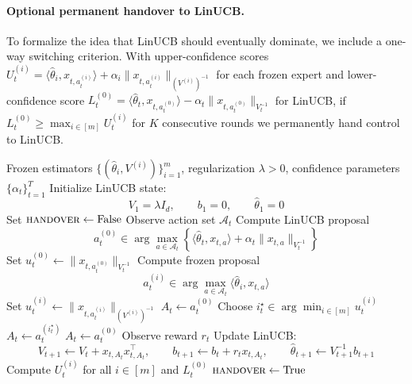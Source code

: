 \documentclass{article}
\theoremstyle{definition}
\theoremstyle{remark}
\theoremstyle{remark}
\begin{document}
\paragraph{Optional permanent handover to LinUCB.}
To formalize the idea that LinUCB should eventually dominate, we include
a one-way switching criterion. With upper-confidence scores
$U_t^{(i)} = \langle\widehat\theta_i,x_{t,a_t^{(i)}}\rangle + \alpha_i\|x_{t,a_t^{(i)}}\|_{(V^{(i)})^{-1}}$
for each frozen expert and lower-confidence score
$L_t^{(0)} = \langle\widehat\theta_t,x_{t,a_t^{(0)}}\rangle - \alpha_t\|x_{t,a_t^{(0)}}\|_{V_t^{-1}}$
for LinUCB, if $L_t^{(0)} \ge \max_{i\in[m]} U_t^{(i)}$ for $K$
consecutive rounds we permanently hand control to LinUCB.

\begin{algorithm}[t]
\caption{Confidence-Gated Master over Frozen Policies and LinUCB}
\label{alg:confidence-gated}
\begin{algorithmic}[1]
\Require Frozen estimators $\{(\widehat{\theta}_i,V^{(i)})\}_{i=1}^m$, regularization $\lambda>0$, confidence parameters $\{\alpha_t\}_{t=1}^T$
\State Initialize LinUCB state:
\[
V_1=\lambda I_d,\qquad b_1=0,\qquad \widehat{\theta}_1=0
\]
\State Set $\textsc{handover}\gets \mathrm{False}$
    \State Observe action set $\mathcal{A}_t$
    \State Compute LinUCB proposal
    \[
    a_t^{(0)} \in \arg\max_{a\in\mathcal{A}_t}
    \left\{
    \langle \widehat{\theta}_t,x_{t,a}\rangle
    + \alpha_t \|x_{t,a}\|_{V_t^{-1}}
    \right\}
    \]
    \State Set $u_t^{(0)} \gets \|x_{t,a_t^{(0)}}\|_{V_t^{-1}}$
        \State Compute frozen proposal
        \[
        a_t^{(i)} \in \arg\max_{a\in\mathcal{A}_t}
        \langle \widehat{\theta}_i,x_{t,a}\rangle
        \]
        \State Set $u_t^{(i)} \gets \|x_{t,a_t^{(i)}}\|_{(V^{(i)})^{-1}}$
    \EndFor
        \State $A_t \gets a_t^{(0)}$
    \Else
        \State Choose $i_t^\star \in \arg\min_{i\in[m]} u_t^{(i)}$
            \State $A_t \gets a_t^{(i_t^\star)}$
        \Else
            \State $A_t \gets a_t^{(0)}$
        \EndIf
    \EndIf
    \State Observe reward $r_t$
    \State Update LinUCB:
    \[
    V_{t+1}\gets V_t + x_{t,A_t}x_{t,A_t}^\top,
    \qquad
    b_{t+1}\gets b_t + r_t x_{t,A_t},
    \qquad
    \widehat{\theta}_{t+1}\gets V_{t+1}^{-1}b_{t+1}
    \]
    \State Compute $U_t^{(i)}$ for all $i\in[m]$ and $L_t^{(0)}$
        \State $\textsc{handover}\gets \mathrm{True}$
    \EndIf
\EndFor
\end{algorithmic}
\end{algorithm}
\end{document}
